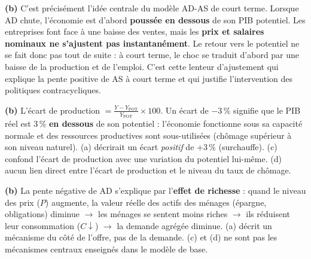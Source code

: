 \begin{reponse}
\textbf{(b)} C'est précisément l'idée centrale du modèle AD-AS de court terme. Lorsque AD chute, l'économie est d'abord \textbf{poussée en dessous} de son PIB potentiel. Les entreprises font face à une baisse des ventes, mais les \textbf{prix et salaires nominaux ne s'ajustent pas instantanément}. Le retour vers le potentiel ne se fait donc pas tout de suite : à court terme, le choc se traduit d'abord par une baisse de la production et de l'emploi. C'est cette lenteur d'ajustement qui explique la pente positive de AS à court terme et qui justifie l'intervention des politiques contracycliques.
\end{reponse}


\begin{reponse}
\textbf{(b)} L'écart de production $= \frac{Y - Y_{\text{POT}}}{Y_{\text{POT}}} \times 100$. Un écart de $-3\,\%$ signifie que le PIB réel est 3\,\% \textbf{en dessous} de son potentiel : l'économie fonctionne sous sa capacité normale et des ressources productives sont sous-utilisées (chômage supérieur à son niveau naturel). (a) décrirait un écart \textit{positif} de $+3\,\%$ (surchauffe). (c) confond l'écart de production avec une variation du potentiel lui-même. (d) aucun lien direct entre l'écart de production et le niveau du taux de chômage.
\end{reponse}


\begin{reponse}
\textbf{(b)} La pente négative de AD s'explique par l'\textbf{effet de richesse} : quand le niveau des prix ($P$) augmente, la valeur réelle des actifs des ménages (épargne, obligations) diminue $\to$ les ménages se sentent moins riches $\to$ ils réduisent leur consommation ($C \downarrow$) $\to$ la demande agrégée diminue. (a) décrit un mécanisme du côté de l'offre, pas de la demande. (c) et (d) ne sont pas les mécanismes centraux enseignés dans le modèle de base.
\end{reponse}

